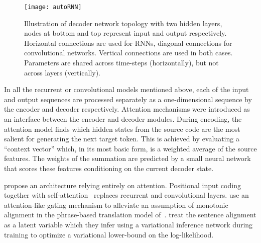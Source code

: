 \documentclass[11pt,a4paper]{article}
\begin{document}
\begin{figure}
\centering
\texttt{[image: autoRNN]}
\caption{Illustration of decoder network topology with two hidden layers, nodes at bottom and top represent input and output respectively.
Horizontal connections are used for RNNs, diagonal connections for convolutional networks. Vertical connections are used in both cases.
Parameters are shared across time-steps (horizontally), but not across layers (vertically).
\label{fig:autoRNN}}
\end{figure}

In all the recurrent or convolutional models mentioned above, each of the input and output sequences are processed separately as a one-dimensional sequence by the encoder and decoder respectively.
Attention mechanisms \citep{bahdanau15iclr, luong15emnlp, xu15icml} were introduced as an interface between the encoder and decoder modules. During encoding, the attention model finds which hidden states from the source code are the most salient for generating the next target token. This is achieved by evaluating a ``context vector'' which, in its most basic form, is a weighted average of the source features. The weights of the summation are predicted by a small neural network that scores these features conditioning on the current decoder state.

\citet{vaswani17nips} propose an architecture relying entirely on attention.
Positional input coding together with self-attention~\cite{parikh16emnlp, lin17iclr} replaces recurrent and convolutional layers. 
\citet{huang18iclr} use an attention-like gating mechanism to alleviate an assumption of monotonic alignment in the phrase-based translation model of~\citet{wang17icml}.
\citet{deng18arxiv} treat the sentence alignment as a latent variable which they infer using a variational inference network during training to optimize a variational lower-bound on the log-likelihood.
\end{document}
